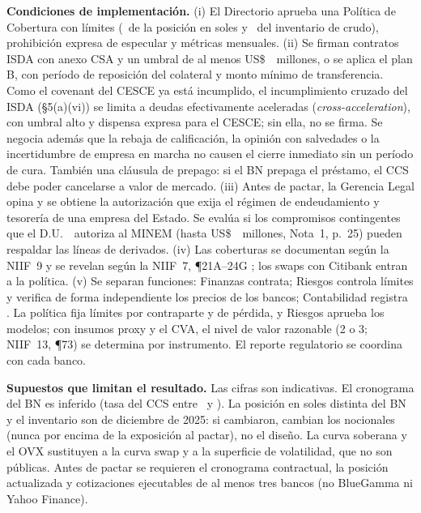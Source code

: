 \textbf{Condiciones de implementación.} (i) El Directorio aprueba una Política de Cobertura con límites (\LimiteFX\
de la posición en soles y \LimiteCrudo\ del inventario de crudo), prohibición expresa de especular y métricas
mensuales. (ii) Se firman contratos ISDA con anexo CSA y un umbral de al menos US\$~\UmbralNecesario\ millones, o se
aplica el plan B, con período de reposición del colateral y monto mínimo de transferencia. Como el covenant del
CESCE ya está incumplido, el incumplimiento cruzado del ISDA (§5(a)(vi)) se limita a deudas efectivamente aceleradas
(\emph{cross-acceleration}), con umbral alto y dispensa expresa para el CESCE; sin ella, no se firma. Se negocia además que la rebaja de calificación, la opinión con salvedades o la incertidumbre de
empresa en marcha no causen el cierre inmediato sin un período de cura. También una cláusula de prepago: si el BN
prepaga el préstamo, el CCS debe poder cancelarse a valor de mercado. (iii) Antes de pactar, la Gerencia Legal opina y
se obtiene la autorización que exija el régimen de endeudamiento y tesorería de una empresa del Estado. Se evalúa si
los compromisos contingentes que el D.U.~\DUCrisis\ autoriza al MINEM (hasta US\$~\DUCrisisMonto\ millones, Nota~1,
p.~25) pueden respaldar las líneas de derivados. (iv) Las coberturas se documentan según la NIIF~9 y se revelan según la NIIF~7, ¶21A--24G
\parencite{ifrs9}; los swaps con Citibank entran a la política. (v) Se separan funciones: Finanzas contrata; Riesgos controla límites y verifica de forma independiente los
precios de los bancos; Contabilidad registra \parencite{humala2026}. La política fija límites por contraparte y de pérdida, y Riesgos
aprueba los modelos; con insumos proxy y el CVA, el nivel de valor razonable (2 o 3; NIIF~13, ¶73) se determina por
instrumento. El reporte
regulatorio se coordina con cada banco.

\textbf{Supuestos que limitan el resultado.} Las cifras son indicativas. El cronograma del BN es inferido (tasa
del CCS entre \CCSTasaMin\ y \CCSTasaMax). La posición en soles distinta del BN y el inventario son de diciembre de
2025: si cambiaron, cambian los nocionales (nunca por encima de la exposición al pactar), no el diseño. La curva soberana y el OVX sustituyen a la curva swap y a la
superficie de volatilidad, que no son públicas. Antes de pactar se requieren el cronograma contractual, la posición
actualizada y cotizaciones ejecutables de al menos tres bancos (no BlueGamma ni Yahoo Finance).
